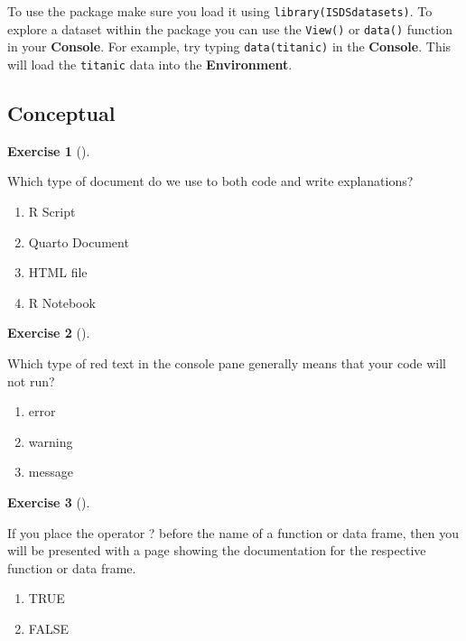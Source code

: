 \documentclass[
  letterpaper,
  DIV=11,
  numbers=noendperiod]{scrreprt}
\providecommand{\tightlist}{%
  \setlength{\itemsep}{0pt}\setlength{\parskip}{0pt}}\usepackage{longtable,booktabs,array}
\theoremstyle{definition}
\newtheorem{exercise}{Exercise}[chapter]
\theoremstyle{remark}
\begin{document}
To use the package make sure you load it using
\texttt{library(ISDSdatasets)}. To explore a dataset within the package
you can use the \texttt{View()} or \texttt{data()} function in your
\textbf{Console}. For example, try typing \texttt{data(titanic)} in the
\textbf{Console}. This will load the \texttt{titanic} data into the
\textbf{Environment}.

\hypertarget{sec-ex01-conceptual}{%
\subsection{Conceptual}\label{sec-ex01-conceptual}}

\leavevmode{}%
\begin{exercise}[]\label{exr-ch01-c01}

Which type of document do we use to both code and write explanations?

\begin{enumerate}
\def\labelenumi{\alph{enumi})}
\tightlist
\item
  R Script
\item
  Quarto Document
\item
  HTML file
\item
  R Notebook
\end{enumerate}

\end{exercise}

\leavevmode{}%
\begin{exercise}[]\label{exr-ch01-c02}

Which type of red text in the console pane generally means that your
code will not run?

\begin{enumerate}
\def\labelenumi{\alph{enumi})}
\tightlist
\item
  error
\item
  warning
\item
  message
\end{enumerate}

\end{exercise}

\leavevmode{}%
\begin{exercise}[]\label{exr-ch01-c03}

If you place the operator ? before the name of a function or data frame,
then you will be presented with a page showing the documentation for the
respective function or data frame.

\begin{enumerate}
\def\labelenumi{\alph{enumi})}
\tightlist
\item
  TRUE
\item
  FALSE
\end{enumerate}

\end{exercise}
\end{document}
